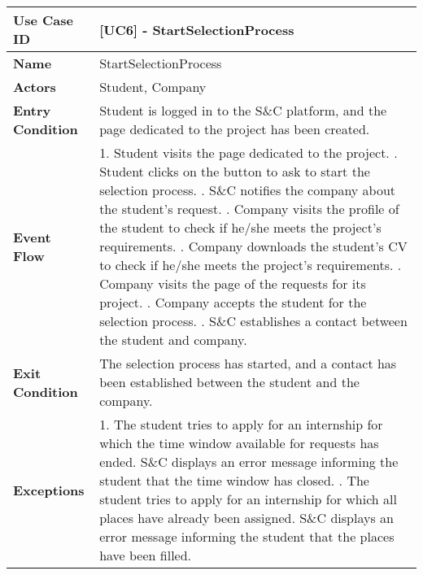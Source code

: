 \begin{table}[H]
    \centering
    \renewcommand{\arraystretch}{2}
    \begin{tabular}{|l|p{10cm}|}
    \hline
    \textbf{Use Case ID} & [UC6] - StartSelectionProcess \\ \hline
    \textbf{Name} & StartSelectionProcess \\ \hline
    \textbf{Actors} & Student, Company \\ \hline
    \textbf{Entry Condition} & Student is logged in to the S\&C platform, and the page dedicated to the project has been created. \\ \hline
    \textbf{Event Flow} & 
    1. Student visits the page dedicated to the project. \newline
    2. Student clicks on the button to ask to start the selection process. \newline
    3. S\&C notifies the company about the student's request. \newline
    4. Company visits the profile of the student to check if he/she meets the project's requirements. \newline
    5. Company downloads the student's CV to check if he/she meets the project's requirements. \newline
    6. Company visits the page of the requests for its project. \newline
    7. Company accepts the student for the selection process. \newline
    8. S\&C establishes a contact between the student and company. \\ \hline
    \textbf{Exit Condition} & The selection process has started, and a contact has been established between the student and the company. \\ \hline
    \textbf{Exceptions} & 
    1. The student tries to apply for an internship for which the time window available for requests has ended. S\&C displays an error message informing the student that the time window has closed. \newline
    2. The student tries to apply for an internship for which all places have already been assigned. S\&C displays an error message informing the student that the places have been filled. \\ \hline
    \end{tabular}
\end{table}

\newpage
    

